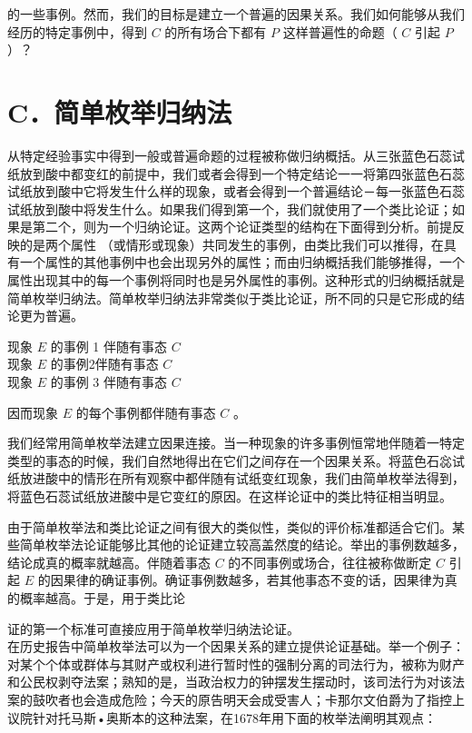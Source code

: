 的一些事例。然而，我们的目标是建立一个普遍的因果关系。我们如何能够从我们经历的特定事例中，得到 $C$ 的所有场合下都有 $P$ 这样普遍性的命题（ $C$ 引起 $P$ ）？

\section*{C．简单枚举归纳法}
从特定经验事实中得到一般或普遍命题的过程被称做归纳概括。从三张蓝色石蕊试纸放到酸中都变红的前提中，我们或者会得到一个特定结论一一将第四张蓝色石蕊试纸放到酸中它将发生什么样的现象，或者会得到一个普遍结论－每一张蓝色石蕊试纸放到酸中将发生什么。如果我们得到第一个，我们就使用了一个类比论证；如果是第二个，则为一个归纳论证。这两个论证类型的结构在下面得到分析。前提反映的是两个属性 （或情形或现象）共同发生的事例，由类比我们可以推得，在具有一个属性的其他事例中也会出现另外的属性；而由归纳概括我们能够推得，一个属性出现其中的每一个事例将同时也是另外属性的事例。这种形式的归纳概括就是简单枚举归纳法。简单枚举归纳法非常类似于类比论证，所不同的只是它形成的结论更为普遍。

\begin{displayquote}
现象 $E$ 的事例 1 伴随有事态 $C$\\
现象 $E$ 的事例2伴随有事态 $C$\\
现象 $E$ 的事例 3 伴随有事态 $C$
\end{displayquote}

因而现象 $E$ 的每个事例都伴随有事态 $C$ 。

我们经常用简单枚举法建立因果连接。当一种现象的许多事例恒常地伴随着一特定类型的事态的时候，我们自然地得出在它们之间存在一个因果关系。将蓝色石惢试纸放进酸中的情形在所有观察中都伴随有试纸变红现象，我们由简单枚举法得到，将蓝色石蕊试纸放进酸中是它变红的原因。在这样论证中的类比特征相当明显。

由于简单枚举法和类比论证之间有很大的类似性，类似的评价标准都适合它们。某些简单枚举法论证能够比其他的论证建立较高盖然度的结论。举出的事例数越多，结论成真的概率就越高。伴随着事态 $C$ 的不同事例或场合，往往被称做断定 $C$ 引起 $E$ 的因果律的确证事例。确证事例数越多，若其他事态不变的话，因果律为真的概率越高。于是，用于类比论

证的第一个标准可直接应用于简单枚举归纳法论证。\\
在历史报告中简单枚举法可以为一个因果关系的建立提供论证基础。举一个例子：对某个个体或群体与其财产或权利进行暂时性的强制分离的司法行为，被称为财产和公民权剥夺法案；熟知的是，当政治权力的钟摆发生摆动时，该司法行为对该法案的鼓吹者也会造成危险；今天的原告明天会成受害人；卡那尔文伯爵为了指控上议院针对托马斯•奥斯本的这种法案，在1678年用下面的枚举法阐明其观点：

